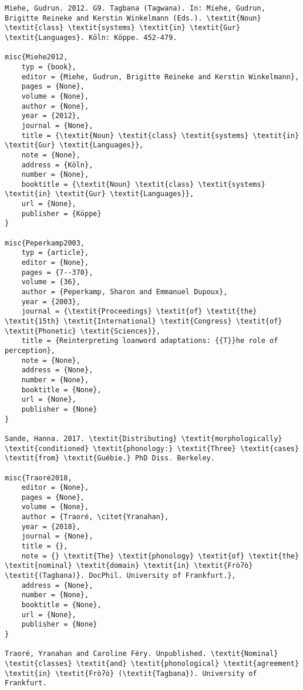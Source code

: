 \begin{verbatim}
Miehe, Gudrun. 2012. G9. Tagbana (Tagwana). In: Miehe, Gudrun, Brigitte Reineke and Kerstin Winkelmann (Eds.). \textit{Noun} \textit{class} \textit{systems} \textit{in} \textit{Gur} \textit{Languages}. Köln: Köppe. 452-479.

misc{Miehe2012,
	typ = {book},
	editor = {Miehe, Gudrun, Brigitte Reineke and Kerstin Winkelmann},
	pages = {None},
	volume = {None},
	author = {None},
	year = {2012},
	journal = {None},
	title = {\textit{Noun} \textit{class} \textit{systems} \textit{in} \textit{Gur} \textit{Languages}},
	note = {None},
	address = {Köln},
	number = {None},
	booktitle = {\textit{Noun} \textit{class} \textit{systems} \textit{in} \textit{Gur} \textit{Languages}},
	url = {None},
	publisher = {Köppe}
}

misc{Peperkamp2003,
	typ = {article},
	editor = {None},
	pages = {7--370},
	volume = {36},
	author = {Peperkamp, Sharon and Emmanuel Dupoux},
	year = {2003},
	journal = {\textit{Proceedings} \textit{of} \textit{the} \textit{15th} \textit{International} \textit{Congress} \textit{of} \textit{Phonetic} \textit{Sciences}},
	title = {Reinterpreting loanword adaptations: {{T}}he role of perception},
	note = {None},
	address = {None},
	number = {None},
	booktitle = {None},
	url = {None},
	publisher = {None}
}

Sande, Hanna. 2017. \textit{Distributing} \textit{morphologically} \textit{conditioned} \textit{phonology:} \textit{Three} \textit{cases} \textit{from} \textit{Guébie.} PhD Diss. Berkeley.

misc{Traoré2018,
	editor = {None},
	pages = {None},
	volume = {None},
	author = {Traoré, \citet{Yranahan},
	year = {2018},
	journal = {None},
	title = {},
	note = {} \textit{The} \textit{phonology} \textit{of} \textit{the} \textit{nominal} \textit{domain} \textit{in} \textit{Fròʔò} \textit{(Tagbana)}. DocPhil. University of Frankfurt.},
	address = {None},
	number = {None},
	booktitle = {None},
	url = {None},
	publisher = {None}
}

Traoré, Yranahan and Caroline Féry. Unpublished. \textit{Nominal} \textit{classes} \textit{and} \textit{phonological} \textit{agreement} \textit{in} \textit{Fròʔò} (\textit{Tagbana}). University of Frankfurt.

\end{verbatim}